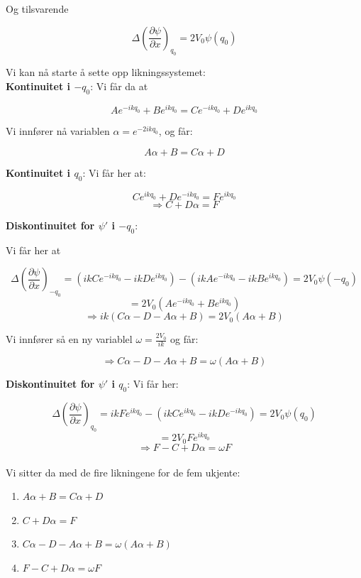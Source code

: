 \documentclass[a4paper,norsk, 10pt]{article}
\numberwithin{equation}{section}
\begin{document}
Og tilsvarende

\begin{equation}
\Delta \left(\frac{\partial \psi}{\partial x}\right)_{q_0} = 2V_0\psi(q_0)
\end{equation}



Vi kan nå starte å sette opp likningssystemet:\\

\textbf{Kontinuitet i $-q_0$}: 
Vi får da at 

$$
Ae^{-ikq_0} + Be^{ikq_0} = Ce^{-ikq_0} + De^{ikq_0}
$$

Vi innfører nå variablen $\alpha = e^{-2ikq_0}$, og får:

$$
A\alpha + B =C\alpha + D
$$

\textbf{Kontinuitet i $q_0$}: 
Vi får her at:

$$
Ce^{ikq_0} + De^{-ikq_0} = Fe^{ikq_0} 
$$
$$
\Rightarrow C + D\alpha = F
$$

\textbf{Diskontinuitet for $\psi'$ i $-q_0$}:

Vi får her at

$$
\Delta \left(\frac{\partial \psi}{\partial x}\right)_{-q_0} = (ikCe^{-ikq_0} -ikDe^{ikq_0} ) - (ikAe^{-ikq_0} - ikBe^{ikq_0}) = 2V_0\psi(-q_0) 
$$
$$
= 2V_0(Ae^{-ikq_0} + Be^{ikq_0})
$$
$$
\Rightarrow ik(C\alpha - D -A\alpha + B) = 2V_0(A\alpha + B)
$$

Vi innfører så en ny variablel $\omega = \frac{2V_0}{ik}$ og får:

$$
\Rightarrow C\alpha - D -A\alpha + B = \omega(A\alpha + B)
$$

\textbf{Diskontinuitet for $\psi'$ i $q_0$}:
Vi får her:

$$
\Delta \left(\frac{\partial \psi}{\partial x}\right)_{q_0} = ikFe^{ikq_0} - (ikCe^{ikq_0} -ikDe^{-ikq_0}) = 2V_0\psi(q_0)
$$
$$
= 2V_0Fe^{ikq_0}
$$
$$
\Rightarrow F - C + D\alpha = \omega F 
$$\\


Vi sitter da med de fire likningene for de fem ukjente:

\begin{enumerate}
\item $A\alpha + B = C\alpha + D$
\item $C + D\alpha = F$
\item $C\alpha - D -A\alpha + B = \omega(A\alpha + B)$
\item $F - C + D\alpha = \omega F $
\end{enumerate}
\end{document}
